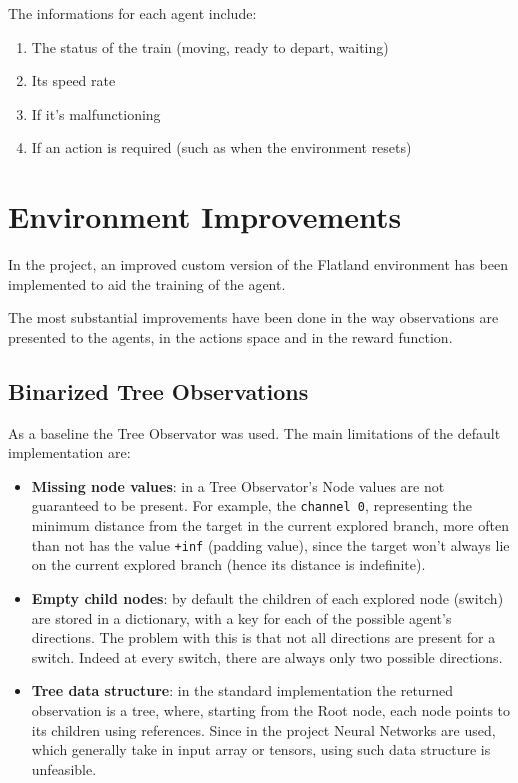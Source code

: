 \documentclass[13pt]{article}
\begin{document}
The informations for each agent include:
\begin{enumerate}
    \item The status of the train (moving, ready to depart, waiting)
    \item Its speed rate
    \item If it's malfunctioning
    \item If an action is required (such as when the environment resets)
\end{enumerate}

\newpage

%
%

\section{Environment Improvements}
In the project, an improved custom version of the Flatland environment has been implemented to aid the training of the agent.

The most substantial improvements have been done in the way observations are presented to the agents, in the actions space and in the reward function.

\subsection{Binarized Tree Observations}
As a baseline the Tree Observator was used. The main limitations of the default implementation are:
\begin{itemize}
    \item \textbf{Missing node values}: in a Tree Observator's Node values are not guaranteed to be present. For example, the \texttt{channel 0}, representing the minimum distance from the target in the current explored branch, more often than not has the value \texttt{+inf} (padding value), since the target won't always lie on the current explored branch (hence its distance is indefinite).
    
    \item \textbf{Empty child nodes}: by default the children of each explored node (switch) are stored in a dictionary, with a key for each of the possible agent's directions. The problem with this is that not all directions are present for a switch. Indeed at every switch, there are always only two possible directions.
    
    \item \textbf{Tree data structure}: in the standard implementation the returned observation is a tree, where, starting from the Root node, each node points to its children using references. Since in the project Neural Networks are used, which generally take in input array or tensors, using such data structure is unfeasible.
\end{itemize}
\end{document}
